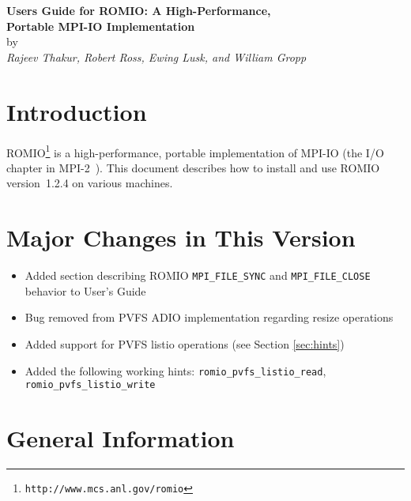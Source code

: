 \tableofcontents
\thispagestyle{empty}
\newpage

\setcounter{page}{1}
\begin{center}
{\bf Users Guide for ROMIO:  A High-Performance,\\[1ex]
Portable MPI-IO Implementation} \\ [2ex]
by \\ [2ex]
{\it Rajeev Thakur, Robert Ross, Ewing Lusk, and William Gropp}

\end{center}
\begin{abstract}
\noindent
ROMIO is a high-performance, portable implementation of MPI-IO (the
I/O chapter in \mbox{MPI-2}). This document describes how to install and use
ROMIO version~1.2.4 on various machines.
\end{abstract}

\section{Introduction} 

ROMIO\footnote{\tt http://www.mcs.anl.gov/romio} is a
high-performance, portable implementation of MPI-IO (the I/O chapter in 
MPI-2~\cite{mpi97a}). This document describes how to install and use
ROMIO version~1.2.4 on various machines.


%
%
\section{Major Changes in This Version}
\begin{itemize}
\item Added section describing ROMIO \texttt{MPI\_FILE\_SYNC} and
      \texttt{MPI\_FILE\_CLOSE} behavior to User's Guide
\item Bug removed from PVFS ADIO implementation regarding resize operations
\item Added support for PVFS listio operations (see Section \ref{sec:hints})
\item Added the following working hints:
      \texttt{romio\_pvfs\_listio\_read}, \texttt{romio\_pvfs\_listio\_write}
\end{itemize}

%
%
\section{General Information}

